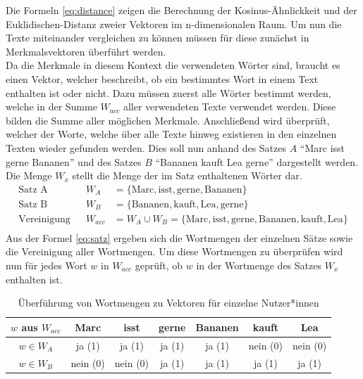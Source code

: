 Die Formeln \eqref{eq:distance} zeigen die Berechnung der Kosinus-Ähnlickkeit und der Euklidischen-Distanz zweier Vektoren im n-dimensionalen Raum. Um nun die Texte miteinander vergleichen zu können müssen für diese zunächst in Merkmalsvektoren überführt werden. \\ \newline
Da die Merkmale in diesem Kontext die verwendeten Wörter sind, braucht es einen Vektor, welcher beschreibt, ob ein bestimmtes Wort in einem Text enthalten ist oder nicht. Dazu müssen zuerst alle Wörter bestimmt werden, welche in der Summe $W_{acc}$ aller verwendeten Texte verwendet werden. Diese bilden die Summe aller möglichen Merkmale. Anschließend wird überprüft, welcher der Worte, welche über alle Texte hinweg existieren in den einzelnen Texten wieder gefunden werden. Dies soll nun anhand des Satzes $A$ "`Marc isst gerne Bananen"' und des Satzes $B$ "`Bananen kauft Lea gerne"' dargestellt werden. Die Menge $W_{x}$ stellt die Menge der im Satz enthaltenen Wörter dar. 
\begin{equation}
	\begin{aligned} 
		\text{Satz A}&& W_{A}&=\{\text{Marc},\text{isst},\text{gerne},\text{Bananen}\}  \\
		\text{Satz B}&& W_{B}&=\{\text{Bananen},\text{kauft},\text{Lea},\text{gerne}\}  \\
		\text{Vereinigung}&& W_{acc} &= W_{A}\cup W_{B} = \{\text{Marc},\text{isst},\text{gerne},\text{Bananen},\text{kauft},\text{Lea}\}  \\
	\end{aligned} 
	\label{eq:satz}
\end{equation}
Aus der Formel \eqref{eq:satz} ergeben sich die Wortmengen der einzelnen Sätze sowie die Vereinigung aller Wortmengen. Um diese Wortmengen zu überprüfen wird nun für jedes Wort $w$ in $W_{acc}$ geprüft, ob $w$ in der Wortmenge des Satzes $W_{x}$ enthalten ist. 


\begin{center}
	\begin{table}
	\begin{tabular}{c | c | c | c | c | c | c}
		
		$w$ aus $W_{acc}$ & Marc 	& isst 		& gerne 	& Bananen 	& kauft 	& Lea		\\
		\hline
		\hline
		$w\in {W}_{A}$ 	  & ja (1)	& ja (1)	& ja (1)	& ja (1)	& nein (0)	& nein (0)	\\
		\hline
		$w\in {W}_{B}$ 	  & nein (0)& nein (0)	& ja (1)	& ja (1)	& ja (1)	& ja (1)

	\end{tabular}
		\caption{Überführung von Wortmengen zu Vektoren für einzelne Nutzer*innen}
	\end{table}
\end{center}

